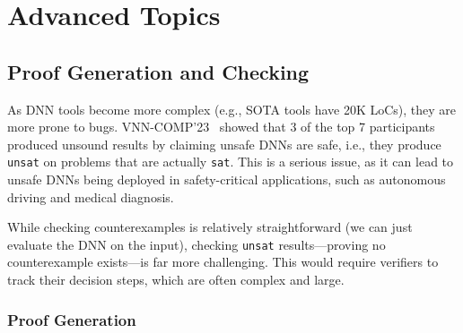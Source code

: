 \documentclass[oneside,11pt,dvipsnames]{book}
\numberwithin{equation}{section}
\theoremstyle{definition}
\theoremstyle{remark}
\newcommand{\sat}{\texttt{sat}}
\newcommand{\unsat}{\texttt{unsat}}
\begin{document}
\part{Advanced Topics\label{part:advanced-topics}}




\chapter{Proof Generation and Checking}\label{chapter:proof-gen-check}

As DNN tools become more complex (e.g., SOTA tools have 20K LoCs), they are more prone to bugs. VNN-COMP'23~\cite{brix2023fourth} showed that 3 of the top 7 participants produced unsound results by claiming unsafe DNNs are safe, i.e., they produce \unsat{} on problems that are actually \sat{}. This is a serious issue, as it can lead to unsafe DNNs being deployed in safety-critical applications, such as autonomous driving and medical diagnosis.

While checking counterexamples is relatively straightforward (we can just evaluate the DNN on the input), checking \unsat{} results---proving no counterexample exists---is far more challenging. This would require verifiers to track their decision steps, which are often complex and large. %

\section{Proof Generation}\label{sec:proofgen}

\end{document}
